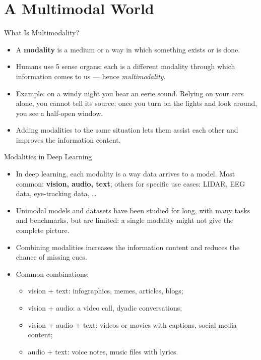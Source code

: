 \section{A Multimodal World}

\begin{frame}{What Is Multimodality?}
\begin{itemize}
  \item A \textbf{modality} is a medium or a way in which something exists or is done.
  \item Humans use 5 sense organs; each is a different modality through which information comes to us --- hence \emph{multimodality}.
  \item Example: on a windy night you hear an eerie sound. Relying on your ears alone, you cannot tell its source; once you turn on the lights and look around, you see a half-open window.
  \item Adding modalities to the same situation lets them assist each other and improves the information content.
\end{itemize}
\end{frame}

\begin{frame}{Modalities in Deep Learning}
\begin{itemize}
  \item In deep learning, each modality is a way data arrives to a model. Most common: \textbf{vision, audio, text}; others for specific use cases: LIDAR, EEG data, eye-tracking data, \ldots
  \item Unimodal models and datasets have been studied for long, with many tasks and benchmarks, but are limited: a single modality might not give the complete picture.
  \item Combining modalities increases the information content and reduces the chance of missing cues.
  \item Common combinations:
  \begin{itemize}
    \item vision + text: infographics, memes, articles, blogs;
    \item vision + audio: a video call, dyadic conversations;
    \item vision + audio + text: videos or movies with captions, social media content;
    \item audio + text: voice notes, music files with lyrics.
  \end{itemize}
\end{itemize}
\end{frame}

